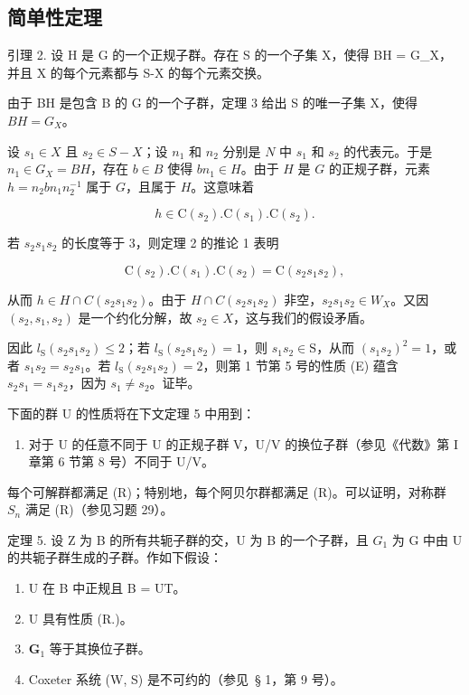 \subsection{简单性定理}

引理 2. 设 H 是 G 的一个正规子群。存在 S 的一个子集 X，使得 BH = G\_X，并且 X 的每个元素都与 S-X 的每个元素交换。

由于 BH 是包含 B 的 G 的一个子群，定理 3 给出 S 的唯一子集 X，使得 \(BH = G_{X}\)。

设 \(s_1 \in X\) 且 \(s_2 \in S - X\)；设 \(n_1\) 和 \(n_2\) 分别是 \(N\) 中 \(s_1\) 和 \(s_2\) 的代表元。于是 \(n_1 \in G_X = BH\)，存在 \(b \in B\) 使得 \(bn_1 \in H\)。由于 \(H\) 是 \(G\) 的正规子群，元素 \(h = n_2bn_1n_2^{-1}\) 属于 \(G\)，且属于 \(H\)。这意味着

\[
h \in \mathrm{C} (s _ {2}). \mathrm{C} (s _ {1}). \mathrm{C} (s _ {2}).
\]

若 \(s_2s_1s_2\) 的长度等于 3，则定理 2 的推论 1 表明

\[
\mathrm{C} (s _ {2}). \mathrm{C} (s _ {1}). \mathrm{C} (s _ {2}) = \mathrm{C} (s _ {2} s _ {1} s _ {2}),
\]

从而 \(h \in H \cap C(s_{2}s_{1}s_{2})\)。由于 \(H \cap C(s_{2}s_{1}s_{2})\) 非空，\(s_{2}s_{1}s_{2} \in W_{X}\)。又因 \((s_{2}, s_{1}, s_{2})\) 是一个约化分解，故 \(s_{2} \in X\)，这与我们的假设矛盾。

因此 \(l_{\mathrm{S}}(s_2s_1s_2) \leqslant 2\)；若 \(l_{\mathrm{S}}(s_2s_1s_2) = 1\)，则 \(s_1s_2 \in \mathrm{S}\)，从而 \((s_1s_2)^2 = 1\)，或者 \(s_1s_2 = s_2s_1\)。若 \(l_{\mathrm{S}}(s_2s_1s_2) = 2\)，则第 1 节第 5 号的性质 (E) 蕴含 \(s_2s_1 = s_1s_2\)，因为 \(s_1 \neq s_2\)。证毕。

下面的群 U 的性质将在下文定理 5 中用到：

\begin{enumerate}
\def\labelenumi{(\Alph{enumi})}
\setcounter{enumi}{17}
\tightlist
\item
  对于 U 的任意不同于 U 的正规子群 V，U/V 的换位子群（参见《代数》第 I 章第 6 节第 8 号）不同于 U/V。
\end{enumerate}

每个可解群都满足 (R)；特别地，每个阿贝尔群都满足 (R)。可以证明，对称群 \(S_{n}\) 满足 (R)（参见习题 29）。

定理 5. 设 Z 为 B 的所有共轭子群的交，U 为 B 的一个子群，且 \(G_{1}\) 为 G 中由 U 的共轭子群生成的子群。作如下假设：

\begin{enumerate}
\def\labelenumi{\arabic{enumi})}
\item
  U 在 B 中正规且 B = UT。
\item
  U 具有性质 (R.)。
\item
  \(\mathbf{G}_1\) 等于其换位子群。
\item
  Coxeter 系统 (W, S) 是不可约的（参见~§ 1，第 9 号）。
\end{enumerate}

